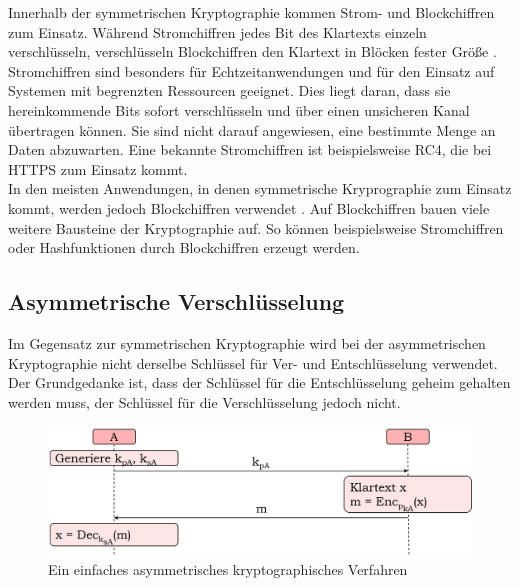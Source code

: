 		Innerhalb der symmetrischen Kryptographie kommen Strom- und Blockchiffren zum Einsatz. Während Stromchiffren jedes Bit des Klartexts einzeln verschlüsseln, verschlüsseln Blockchiffren den Klartext in Blöcken fester Größe \cite{Paar2010-B}.\\
		
		Stromchiffren sind besonders für Echtzeitanwendungen und für den Einsatz auf Systemen mit begrenzten Ressourcen geeignet. Dies liegt daran, dass sie hereinkommende Bits sofort verschlüsseln und über einen unsicheren Kanal übertragen können. Sie sind nicht darauf angewiesen, eine bestimmte Menge an Daten abzuwarten. Eine bekannte Stromchiffren ist beispielsweise RC4, die bei HTTPS zum Einsatz kommt.\\
		
		In den meisten Anwendungen, in denen symmetrische Kryprographie zum Einsatz kommt, werden jedoch Blockchiffren verwendet \cite{Paar2010-B}. Auf Blockchiffren bauen viele weitere Bausteine der Kryptographie auf. So können beispielsweise Stromchiffren oder Hashfunktionen durch Blockchiffren erzeugt werden.
		
		\subsection{Asymmetrische Verschlüsselung}
		\label{subsec:grundlagen:krypto:asym}
		
		Im Gegensatz zur symmetrischen Kryptographie wird bei der asymmetrischen Kryptographie nicht derselbe Schlüssel für Ver- und Entschlüsselung verwendet. Der Grundgedanke ist, dass der Schlüssel für die Entschlüsselung geheim gehalten werden muss, der Schlüssel für die Verschlüsselung jedoch nicht.\\
		
		\begin{figure}[htbp]
			\centering
			\includegraphics[width=\textwidth]{chapters/abb/grundlagen-krypto-asym}
			\caption{Ein einfaches asymmetrisches kryptographisches Verfahren}
			\label{fig:krypto:asym}
		\end{figure}
		
